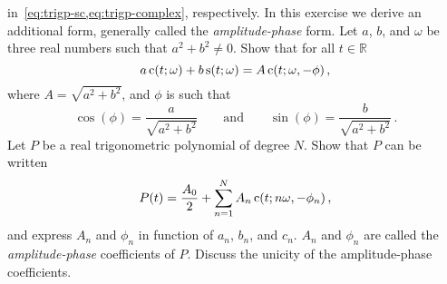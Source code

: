 \begin{ExerciseList}
  in~\cref{eq:trigp-sc,eq:trigp-complex}, respectively. In this exercise we derive an additional form, generally called the \emph{amplitude-phase} form.
  \Question Let $a$, $b$, and $\omega$ be three real numbers such that $a^2+b^2\neq0$. Show that for all $t\in\mathbb{R}$
  \begin{equation}
    a\operatorname{c}(t;\omega)+b\operatorname{s}(t;\omega)=A\operatorname{c}(t;\omega,-\phi)\,,
  \end{equation}
  where $A=\sqrt{a^2+b^2}$, and $\phi$ is such that
  \begin{equation}
    \cos(\phi)=\frac{a}{\sqrt{a^2+b^2}}\qquad\text{and}\qquad
    \sin(\phi)=\frac{b}{\sqrt{a^2+b^2}}\,.
  \end{equation}
  \Question Let $P$ be a real trigonometric polynomial of degree $N$. Show that $P$ can be written
  \begin{equation}
    P(t)=\frac{A_0}{2}+\sum_{n=1}^NA_n\operatorname{c}(t;n\omega,-\phi_n)\,,
  \end{equation}
  and express $A_n$ and $\phi_n$ in function of $a_n$, $b_n$, and $c_n$. $A_n$ and $\phi_n$ are called the \emph{amplitude-phase} coefficients of $P$.
  \Question Discuss the unicity of the amplitude-phase coefficients.
\end{ExerciseList}